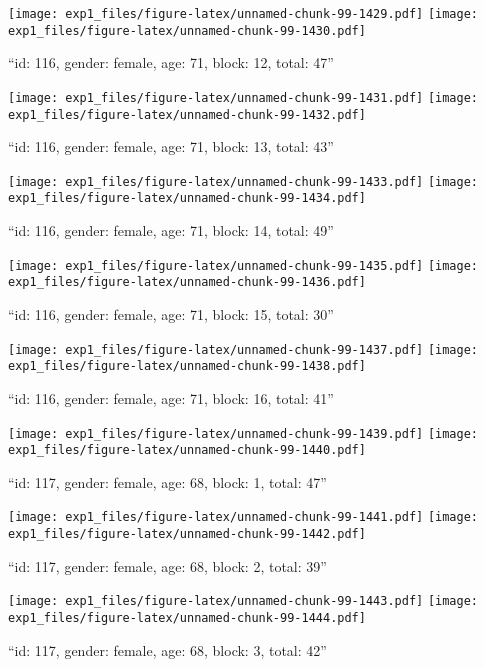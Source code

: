 \documentclass[,]{article}
\begin{document}
\texttt{[image: exp1\_files/figure-latex/unnamed-chunk-99-1429.pdf]}
\texttt{[image: exp1\_files/figure-latex/unnamed-chunk-99-1430.pdf]}

\newpage
[1] 

``id: 116, gender: female, age: 71, block: 12, total: 47''

\texttt{[image: exp1\_files/figure-latex/unnamed-chunk-99-1431.pdf]}
\texttt{[image: exp1\_files/figure-latex/unnamed-chunk-99-1432.pdf]}

\newpage
[1] 

``id: 116, gender: female, age: 71, block: 13, total: 43''

\texttt{[image: exp1\_files/figure-latex/unnamed-chunk-99-1433.pdf]}
\texttt{[image: exp1\_files/figure-latex/unnamed-chunk-99-1434.pdf]}

\newpage
[1] 

``id: 116, gender: female, age: 71, block: 14, total: 49''

\texttt{[image: exp1\_files/figure-latex/unnamed-chunk-99-1435.pdf]}
\texttt{[image: exp1\_files/figure-latex/unnamed-chunk-99-1436.pdf]}

\newpage
[1] 

``id: 116, gender: female, age: 71, block: 15, total: 30''

\texttt{[image: exp1\_files/figure-latex/unnamed-chunk-99-1437.pdf]}
\texttt{[image: exp1\_files/figure-latex/unnamed-chunk-99-1438.pdf]}

\newpage
[1] 

``id: 116, gender: female, age: 71, block: 16, total: 41''

\texttt{[image: exp1\_files/figure-latex/unnamed-chunk-99-1439.pdf]}
\texttt{[image: exp1\_files/figure-latex/unnamed-chunk-99-1440.pdf]}

\newpage
[1] 

``id: 117, gender: female, age: 68, block: 1, total: 47''

\texttt{[image: exp1\_files/figure-latex/unnamed-chunk-99-1441.pdf]}
\texttt{[image: exp1\_files/figure-latex/unnamed-chunk-99-1442.pdf]}

\newpage
[1] 

``id: 117, gender: female, age: 68, block: 2, total: 39''

\texttt{[image: exp1\_files/figure-latex/unnamed-chunk-99-1443.pdf]}
\texttt{[image: exp1\_files/figure-latex/unnamed-chunk-99-1444.pdf]}

\newpage
[1] 

``id: 117, gender: female, age: 68, block: 3, total: 42''
\end{document}
